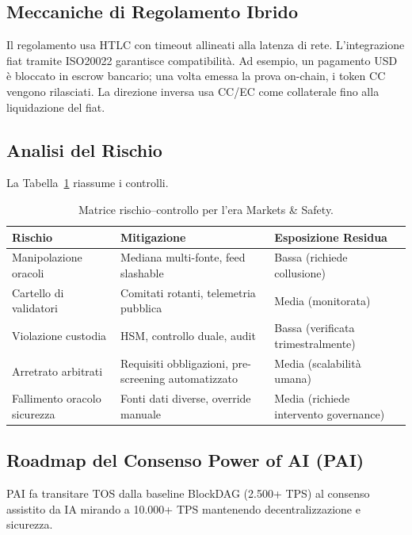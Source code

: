 \documentclass[11pt]{article}
\begin{document}
\subsection{Meccaniche di Regolamento Ibrido}
Il regolamento usa HTLC con timeout allineati alla latenza di rete. L'integrazione fiat tramite ISO20022 garantisce compatibilità. Ad esempio, un pagamento USD è bloccato in escrow bancario; una volta emessa la prova on-chain, i token CC vengono rilasciati. La direzione inversa usa CC/EC come collaterale fino alla liquidazione del fiat.

\subsection{Analisi del Rischio}
La Tabella~\ref{tab:risk-markets} riassume i controlli.

\begin{table}[H]
  \centering
  \begin{tabular}{p{}p{}p{}}
    \toprule
    \textbf{Rischio} & \textbf{Mitigazione} & \textbf{Esposizione Residua} \\
    \midrule
    Manipolazione oracoli & Mediana multi-fonte, feed slashable & Bassa (richiede collusione) \\
    Cartello di validatori & Comitati rotanti, telemetria pubblica & Media (monitorata) \\
    Violazione custodia & HSM, controllo duale, audit & Bassa (verificata trimestralmente) \\
    Arretrato arbitrati & Requisiti obbligazioni, pre-screening automatizzato & Media (scalabilità umana) \\
    Fallimento oracolo sicurezza & Fonti dati diverse, override manuale & Media (richiede intervento governance) \\
    \bottomrule
  \end{tabular}
  \caption{Matrice rischio--controllo per l'era Markets \& Safety.}
  \label{tab:risk-markets}
\end{table}

\subsection{Roadmap del Consenso Power of AI (PAI)}
\label{sec:pai-roadmap}
PAI fa transitare TOS dalla baseline BlockDAG (2.500+ TPS) al consenso assistito da IA mirando a 10.000+ TPS mantenendo decentralizzazione e sicurezza.
\end{document}
